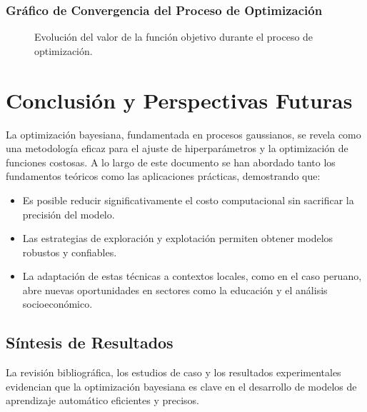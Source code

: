 \documentclass[12pt]{article}
\begin{document}
	\subsubsection{Gráfico de Convergencia del Proceso de Optimización}
	\begin{figure}[H]
		\centering
		\caption{Evolución del valor de la función objetivo durante el proceso de optimización.}
		\label{fig:convergencia}
	\end{figure}
	
	\section{Conclusión y Perspectivas Futuras}
	La optimización bayesiana, fundamentada en procesos gaussianos, se revela como una metodología eficaz para el ajuste de hiperparámetros y la optimización de funciones costosas. A lo largo de este documento se han abordado tanto los fundamentos teóricos como las aplicaciones prácticas, demostrando que:
	
	\begin{itemize}[leftmargin=1.5cm]
		\item Es posible reducir significativamente el costo computacional sin sacrificar la precisión del modelo.
		\item Las estrategias de exploración y explotación permiten obtener modelos robustos y confiables.
		\item La adaptación de estas técnicas a contextos locales, como en el caso peruano, abre nuevas oportunidades en sectores como la educación y el análisis socioeconómico.
	\end{itemize}
	\lipsum[25]
	
	\subsection{Síntesis de Resultados}
	La revisión bibliográfica, los estudios de caso y los resultados experimentales evidencian que la optimización bayesiana es clave en el desarrollo de modelos de aprendizaje automático eficientes y precisos.  
	\lipsum[26]
	
\end{document}

